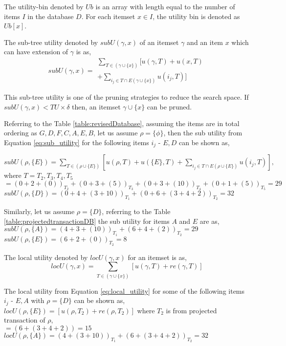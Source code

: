 \documentclass[11pt,openright]{report}
\begin{document}
\begin{definition}
	The utility-bin denoted by $Ub$ is an array with length equal to the number of items $I$ in the database $D$. For each itemset $x \in I$, the utility bin is denoted as $Ub[x]$.
\end{definition}

\begin{definition}
	The sub-tree utility denoted by $subU(\gamma, x)$ of an itemset $\gamma$ and an item $x$ which can have extension of $\gamma$ is as,
	\begin{equation}
	subU(\gamma, x) = \begin{matrix}
	\sum_{T \in (\gamma \cup \{x\})} [u(\gamma,T) + u(x,T)
	\\ 
	+ \sum_{i_j \in T \cap E(\gamma \cup \{x\})}u(i_j,T)]
	\end{matrix}
	\label{eq:sub_utility}
	\end{equation}
\end{definition}
This sub-tree utility is one of the pruning strategies to reduce the search space. If $subU(\gamma, x) < TU \times \delta$ then, an itemset $\gamma \cup \{x\}$ can be pruned.

Referring to the Table \ref{table:revisedDatabase}, assuming the items are in total ordering as $G, D, F, C, A, E, B$, let us assume $\rho = \{\phi\}$, then the sub utility from Equation \ref{eq:sub_utility} for the following items $i_j$ - $E, D$ can be shown as,

$subU(\rho, \{E\})  = \sum_{T \in (\rho \cup \{E\})} [u(\rho,T) + u(\{E\},T) + \sum_{i_j \in T \cap E(\rho \cup \{E\})}u(i_j,T)],$ where $T = T_2, T_3, T_4, T_5$ \\
\indent \indent$= (0 + 2 + (0))_{T_2} + (0 + 3 + (5))_{T_3} + (0 + 3 + (10))_{T_4} + (0 + 1 + (5))_{T_5} = 29$
\\ \indent$subU(\rho, \{D\})  = (0 + 4 + (3 + 10))_{T_1} + (0 + 6 + (3 + 4 + 2))_{T_2} = 32$

Similarly, let us assume $\rho = \{D\}$, referring to the Table \ref{table:projectedtransactionDB} the sub utility for items $A$ and $E$ are as,\\
\indent$subU(\rho, \{A\})  = (4 + 3 + (10))_{T_1} + (6 + 4 + (2))_{T_2} = 29$\\
\indent$subU(\rho, \{E\})  = (6 + 2 + (0))_{T_2} = 8$

\begin{definition}
	The local utility denoted by $locU(\gamma, x)$ for an itemset is as, 
	\begin{equation}
	locU(\gamma, x) = \sum_{T \in (\gamma \cup 	\{x\})}[u(\gamma, T) + re(\gamma, T)]		\label{eq:local_utility}
	\end{equation}
\end{definition}
The local utility from Equation \ref{eq:local_utility} for some of the following items $i_j$ - $E, A$ with $\rho = \{D\}$ can be shown as,\\
\indent $locU(\rho, \{E\}) =  [u(\rho, T_2) + re(\rho, T_2)]$ where $T_2$ is from projected transaction of $\rho$,
 \\\indent \indent $= (6 + (3 + 4 + 2)) = 15 $
\\
\indent $locU(\rho, \{A\}) = (4 + (3 + 10))_{T_1} + (6 + (3 + 4 + 2))_{T_2} = 32$
\end{document}
